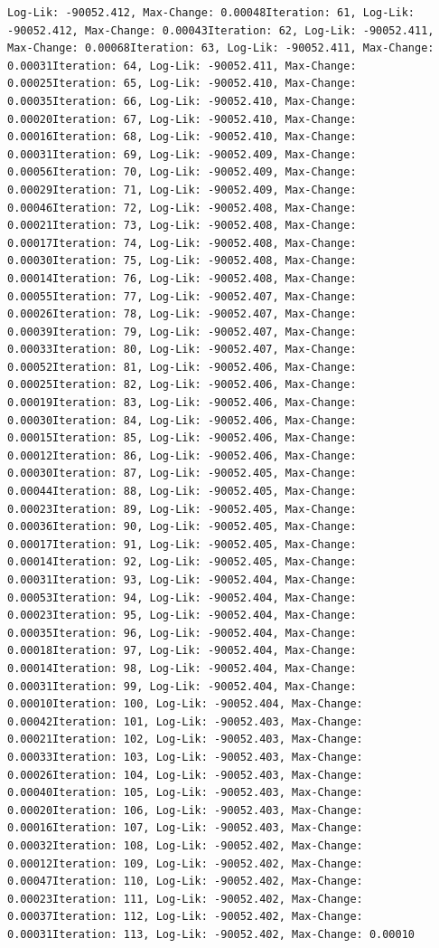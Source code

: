 \documentclass[
  english,
  man]{apa6}
\begin{document}
\begin{verbatim}
Log-Lik: -90052.412, Max-Change: 0.00048Iteration: 61, Log-Lik: -90052.412, Max-Change: 0.00043Iteration: 62, Log-Lik: -90052.411, Max-Change: 0.00068Iteration: 63, Log-Lik: -90052.411, Max-Change: 0.00031Iteration: 64, Log-Lik: -90052.411, Max-Change: 0.00025Iteration: 65, Log-Lik: -90052.410, Max-Change: 0.00035Iteration: 66, Log-Lik: -90052.410, Max-Change: 0.00020Iteration: 67, Log-Lik: -90052.410, Max-Change: 0.00016Iteration: 68, Log-Lik: -90052.410, Max-Change: 0.00031Iteration: 69, Log-Lik: -90052.409, Max-Change: 0.00056Iteration: 70, Log-Lik: -90052.409, Max-Change: 0.00029Iteration: 71, Log-Lik: -90052.409, Max-Change: 0.00046Iteration: 72, Log-Lik: -90052.408, Max-Change: 0.00021Iteration: 73, Log-Lik: -90052.408, Max-Change: 0.00017Iteration: 74, Log-Lik: -90052.408, Max-Change: 0.00030Iteration: 75, Log-Lik: -90052.408, Max-Change: 0.00014Iteration: 76, Log-Lik: -90052.408, Max-Change: 0.00055Iteration: 77, Log-Lik: -90052.407, Max-Change: 0.00026Iteration: 78, Log-Lik: -90052.407, Max-Change: 0.00039Iteration: 79, Log-Lik: -90052.407, Max-Change: 0.00033Iteration: 80, Log-Lik: -90052.407, Max-Change: 0.00052Iteration: 81, Log-Lik: -90052.406, Max-Change: 0.00025Iteration: 82, Log-Lik: -90052.406, Max-Change: 0.00019Iteration: 83, Log-Lik: -90052.406, Max-Change: 0.00030Iteration: 84, Log-Lik: -90052.406, Max-Change: 0.00015Iteration: 85, Log-Lik: -90052.406, Max-Change: 0.00012Iteration: 86, Log-Lik: -90052.406, Max-Change: 0.00030Iteration: 87, Log-Lik: -90052.405, Max-Change: 0.00044Iteration: 88, Log-Lik: -90052.405, Max-Change: 0.00023Iteration: 89, Log-Lik: -90052.405, Max-Change: 0.00036Iteration: 90, Log-Lik: -90052.405, Max-Change: 0.00017Iteration: 91, Log-Lik: -90052.405, Max-Change: 0.00014Iteration: 92, Log-Lik: -90052.405, Max-Change: 0.00031Iteration: 93, Log-Lik: -90052.404, Max-Change: 0.00053Iteration: 94, Log-Lik: -90052.404, Max-Change: 0.00023Iteration: 95, Log-Lik: -90052.404, Max-Change: 0.00035Iteration: 96, Log-Lik: -90052.404, Max-Change: 0.00018Iteration: 97, Log-Lik: -90052.404, Max-Change: 0.00014Iteration: 98, Log-Lik: -90052.404, Max-Change: 0.00031Iteration: 99, Log-Lik: -90052.404, Max-Change: 0.00010Iteration: 100, Log-Lik: -90052.404, Max-Change: 0.00042Iteration: 101, Log-Lik: -90052.403, Max-Change: 0.00021Iteration: 102, Log-Lik: -90052.403, Max-Change: 0.00033Iteration: 103, Log-Lik: -90052.403, Max-Change: 0.00026Iteration: 104, Log-Lik: -90052.403, Max-Change: 0.00040Iteration: 105, Log-Lik: -90052.403, Max-Change: 0.00020Iteration: 106, Log-Lik: -90052.403, Max-Change: 0.00016Iteration: 107, Log-Lik: -90052.403, Max-Change: 0.00032Iteration: 108, Log-Lik: -90052.402, Max-Change: 0.00012Iteration: 109, Log-Lik: -90052.402, Max-Change: 0.00047Iteration: 110, Log-Lik: -90052.402, Max-Change: 0.00023Iteration: 111, Log-Lik: -90052.402, Max-Change: 0.00037Iteration: 112, Log-Lik: -90052.402, Max-Change: 0.00031Iteration: 113, Log-Lik: -90052.402, Max-Change: 0.00010
\end{verbatim}
\end{document}
